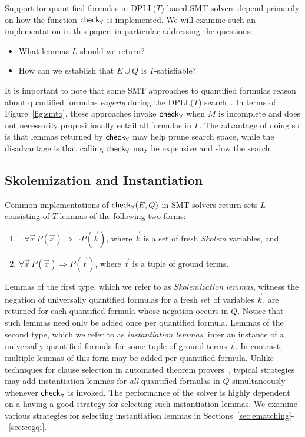 \documentclass{easychair}
\begin{document}
Support for quantified formulas in DPLL($T$)-based SMT solvers depend primarily on how the function $\small\mathsf{check}_\forall$ is implemented.
We will examine such an implementation in this paper, in particular addressing the questions:
\begin{itemize}
\item What lemmas $L$ should we return?
\item How can we establish that $E \cup Q$ is $T$-satisfiable?
\end{itemize}

It is important to note that some SMT approaches to quantified formulas
reason about quantified formulas \emph{eagerly} during the DPLL($T$) search~\cite{MouraBjoerner07}.
In terms of Figure~\ref{fig:smtq}, these approaches invoke $\small\mathsf{check}_\forall$
when $M$ is incomplete and does not necessarily propositionally entail all formulas in $\Gamma$.
The advantage of doing so is that lemmas returned by $\small\mathsf{check}_\forall$ may help prune search space,
while the disadvantage is that calling $\small\mathsf{check}_\forall$ may be expensive and slow the search.

\subsection{Skolemization and Instantiation}
Common implementations of $\small\mathsf{check}_\forall( E, Q )$ in SMT solvers return sets $L$ consisting of $T$-lemmas of the following two forms:
\begin{enumerate}
\item $\neg \forall \vec x\, P( \vec x ) \Rightarrow \neg P( \vec k )$, where $\vec k$ is a set of fresh \emph{Skolem} variables, and
\item $\forall \vec x\, P( \vec x ) \Rightarrow P( \vec t )$, where $\vec t$ is a tuple of ground terms.
\end{enumerate}
Lemmas of the first type, which we refer to as \emph{Skolemization lemmas},
witness the negation of universally quantified formulas for a fresh set of variables $\vec{k}$,
are returned for each quantified formula whose negation occurs in $Q$.
Notice that such lemmas need only be added once per quantified formula.
Lemmas of the second type, which we refer to as \emph{instantiation lemmas},
infer an instance of a universally quantified formula for some tuple of ground terms $\vec{ t }$.
In contrast, multiple lemmas of this form may be added per quantified formula.
Unlike techniques for clause selection in automated theorem provers~\cite{DBLP:conf/cade/SchulzM16},
typical strategies may add instantiation lemmas for \emph{all} quantified formulas in $Q$ simultaneously whenever $\small\mathsf{check}_\forall$ is invoked.
The performance of the solver is highly dependent on a having a good strategy for selecting such instantiation lemmas.
We examine various strategies for selecting instantiation lemmas in Sections~\ref{sec:ematching}-~\ref{sec:cegqi}.
\end{document}
